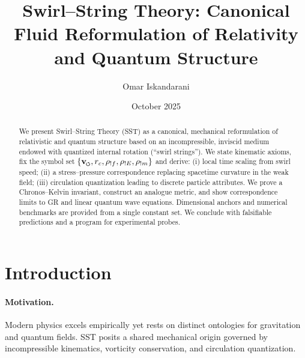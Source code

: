 \documentclass[11pt,a4paper]{article}
\title{Swirl--String Theory: Canonical Fluid Reformulation of Relativity and Quantum Structure}
\author[1]{Omar Iskandarani}
\affil[1]{Independent Researcher}
\date{October 2025}
\newcommand{\swirlarrow}{\mathchoice{\mkern-2mu\scriptstyle\boldsymbol{\circlearrowleft}}{\mkern-2mu\scriptstyle\boldsymbol{\circlearrowleft}}{\mkern-2mu\scriptscriptstyle\boldsymbol{\circlearrowleft}}{\mkern-2mu\scriptscriptstyle\boldsymbol{\circlearrowleft}}}
\newcommand{\vswirl}{\mathbf{v}_{\swirlarrow}} %
\newcommand{\rc}{r_c}                                      %
\newcommand{\rhoF}{\rho_{!f}}                            %
\newcommand{\rhoE}{\rho_{!E}}                            %
\newcommand{\rhoM}{\rho_{!m}}                            %
\begin{document}
\maketitle


\begin{abstract}

\noindent

We present Swirl--String Theory (SST) as a canonical, mechanical reformulation of relativistic and quantum structure based on an incompressible, inviscid medium endowed with quantized internal rotation (``swirl strings''). We state kinematic axioms, fix the symbol set $\{\vswirl,\rc,\rhoF,\rhoE,\rhoM\}$ and derive: (i) local time scaling from swirl speed; (ii) a stress--pressure correspondence replacing spacetime curvature in the weak field; (iii) circulation quantization leading to discrete particle attributes. We prove a Chronos--Kelvin invariant, construct an analogue metric, and show correspondence limits to GR and linear quantum wave equations. Dimensional anchors and numerical benchmarks are provided from a single constant set. We conclude with falsifiable predictions and a program for experimental probes.

\end{abstract}


\tableofcontents



\section{Introduction}

\label{sec:intro}






\paragraph{Motivation.}  Modern physics excels empirically yet rests on distinct ontologies for gravitation and quantum fields. SST posits a shared mechanical origin governed by incompressible kinematics, vorticity conservation, and circulation quantization.
\end{document}
